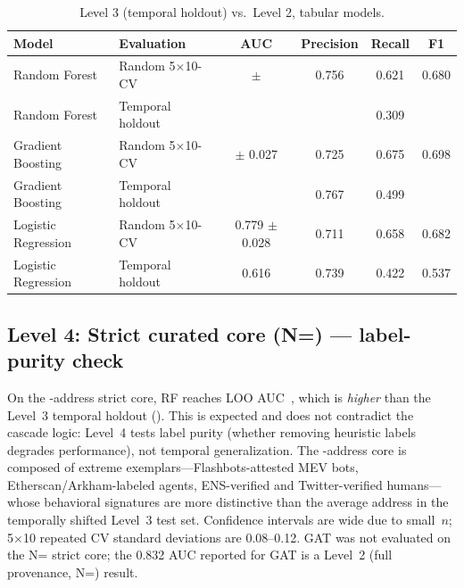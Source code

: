 \documentclass[10pt]{article}
\begin{document}
\begin{table}[h]
\centering
\small
\caption{Level 3 (temporal holdout) vs.\ Level 2, tabular models.}
\label{tab:level3}
\begin{tabular}{llcccc}
\toprule
Model & Evaluation & AUC & Precision & Recall & F1 \\
\midrule
Random Forest & Random 5$\times$10-CV & \randomCvRfAuc{} $\pm$ \randomCvRfAucStd{} & 0.756 & 0.621 & 0.680 \\
Random Forest & Temporal holdout & \temporalHoldoutRfAuc{} & \temporalHoldoutRfPrecision{} & 0.309 & \temporalHoldoutRfF{} \\
Gradient Boosting & Random 5$\times$10-CV & \randomCvGbmAuc{} $\pm$ 0.027 & 0.725 & 0.675 & 0.698 \\
Gradient Boosting & Temporal holdout & \temporalHoldoutGbmAuc{} & 0.767 & 0.499 & \temporalHoldoutGbmF{} \\
Logistic Regression & Random 5$\times$10-CV & 0.779 $\pm$ 0.028 & 0.711 & 0.658 & 0.682 \\
Logistic Regression & Temporal holdout & 0.616 & 0.739 & 0.422 & 0.537 \\
\bottomrule
\end{tabular}
\end{table}

\subsection{Level 4: Strict curated core (N=\datasetStrictCoreN{}) --- label-purity check}

On the \datasetStrictCoreN{}-address strict core, RF reaches LOO AUC~\cascadeLevelStrictCoreAuc{}, which is \emph{higher} than the Level~3 temporal holdout (\temporalHoldoutRfAuc{}). This is expected and does not contradict the cascade logic: Level~4 tests label purity (whether removing heuristic labels degrades performance), not temporal generalization. The \datasetStrictCoreN{}-address core is composed of extreme exemplars---Flashbots-attested MEV bots, Etherscan/Arkham-labeled agents, ENS-verified and Twitter-verified humans---whose behavioral signatures are more distinctive than the average address in the temporally shifted Level~3 test set. Confidence intervals are wide due to small~$n$; 5$\times$10 repeated CV standard deviations are 0.08--0.12. GAT was not evaluated on the N=\datasetStrictCoreN{} strict core; the 0.832 AUC reported for GAT is a Level~2 (full provenance, N=\datasetNAddresses{}) result.
\end{document}

